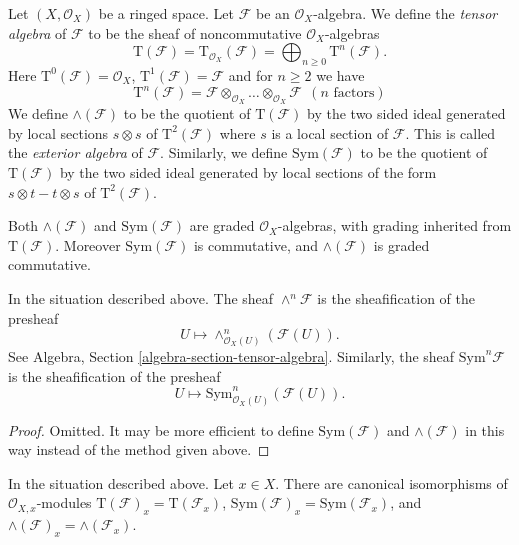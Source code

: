 \noindent
Let $(X, \mathcal{O}_X)$ be a ringed space.
Let $\mathcal{F}$ be an $\mathcal{O}_X$-algebra.
We define the {\it tensor algebra} of $\mathcal{F}$ to be
the sheaf of noncommutative $\mathcal{O}_X$-algebras
$$
\text{T}(\mathcal{F})
=
\text{T}_{\mathcal{O}_X}(\mathcal{F})
= \bigoplus\nolimits_{n \geq 0} \text{T}^n(\mathcal{F}).
$$
Here $\text{T}^0(\mathcal{F}) = \mathcal{O}_X$,
$\text{T}^1(\mathcal{F}) = \mathcal{F}$
and for $n \geq 2$ we have
$$
\text{T}^n(\mathcal{F}) =
\mathcal{F} \otimes_{\mathcal{O}_X} \ldots \otimes_{\mathcal{O}_X} \mathcal{F}
\ \ (n\text{ factors})
$$
We define $\wedge(\mathcal{F})$ to be the quotient of
$\text{T}(\mathcal{F})$ by the two sided ideal generated by
local sections $s \otimes s$ of $\text{T}^2(\mathcal{F})$ where
$s$ is a local section of $\mathcal{F}$. This is
called the {\it exterior algebra} of $\mathcal{F}$.
Similarly, we define $\text{Sym}(\mathcal{F})$ to be
the quotient of $\text{T}(\mathcal{F})$ by the two
sided ideal generated by local sections of the form
$s \otimes t - t \otimes s$ of $\text{T}^2(\mathcal{F})$.

\medskip\noindent
Both $\wedge(\mathcal{F})$ and $\text{Sym}(\mathcal{F})$ are graded
$\mathcal{O}_X$-algebras, with grading inherited from $\text{T}(\mathcal{F})$.
Moreover $\text{Sym}(\mathcal{F})$
is commutative, and $\wedge(\mathcal{F})$ is graded commutative.

\begin{lemma}
\label{lemma-local-tensor-algebra}
In the situation described above.
The sheaf $\wedge^n\mathcal{F}$ is the sheafification of the
presheaf
$$
U \longmapsto \wedge^n_{\mathcal{O}_X(U)}(\mathcal{F}(U)).
$$
See Algebra, Section \ref{algebra-section-tensor-algebra}.
Similarly, the sheaf $\text{Sym}^n\mathcal{F}$ is the sheafification
of the presheaf
$$
U \longmapsto \text{Sym}^n_{\mathcal{O}_X(U)}(\mathcal{F}(U)).
$$
\end{lemma}

\begin{proof}
Omitted. It may be more efficient to define $\text{Sym}(\mathcal{F})$
and $\wedge(\mathcal{F})$ in this way instead of the method
given above.
\end{proof}

\begin{lemma}
\label{lemma-stalk-tensor-algebra}
In the situation described above. Let $x \in X$.
There are canonical isomorphisms of $\mathcal{O}_{X, x}$-modules
$\text{T}(\mathcal{F})_x = \text{T}(\mathcal{F}_x)$,
$\text{Sym}(\mathcal{F})_x = \text{Sym}(\mathcal{F}_x)$, and
$\wedge(\mathcal{F})_x = \wedge(\mathcal{F}_x)$.
\end{lemma}

